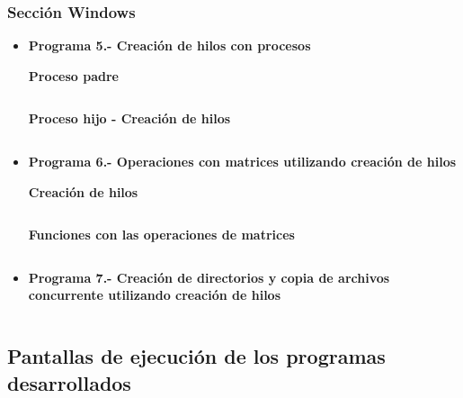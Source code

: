 \documentclass[12pt]{article}
\begin{document}
    	\subsubsection{Sección Windows}
    	
    	\begin{itemize}
    	    \item[\Checkmark] \textbf{Programa 5.- Creación de hilos con procesos}
    	    
    	        \textbf{Proceso padre}
    	        
    	        \inputminted{c++}{Code/Windows/5_padre.c}
    	        \textbf{Proceso hijo - Creación de hilos}
    	        
 				\inputminted{c++}{Code/Windows/5_hijo.c}
    	        
    	    \item[\Checkmark] \textbf{Programa 6.- Operaciones con matrices utilizando creación de hilos}
    	    
    	        \textbf{Creación de hilos}
    	    
    	        \inputminted{c++}{Code/Windows/6.c}
    	        
    	    \textbf{Funciones con las operaciones de matrices}
    	    
    	        \inputminted{c++}{Code/Windows/funciones.h}
    	        
    	    \item[\Checkmark] \textbf{Programa 7.- Creación de directorios y copia de archivos concurrente utilizando creación de hilos}
    	        \inputminted{c++}{Code/Windows/7.c}

            
    	\end{itemize}
    
        
        \newpage
    	\subsection{Pantallas de ejecución de los programas desarrollados}
    		
	        
\end{document}
